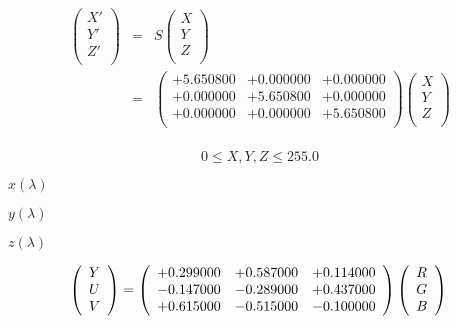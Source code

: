 \documentclass{article}
\begin{document}
\begin{eqnarray*} \left( \begin{array}{l} X' \\ Y' \\ Z' \\ \end{array} \right) &=& S \left( \begin{array}{l} X \\ Y \\ Z \\ \end{array} \right) \\ &=& \left( \begin{array}{lll} +5.650800 & +0.000000 & +0.000000 \\ +0.000000 & +5.650800 & +0.000000 \\ +0.000000 & +0.000000 & +5.650800 \\ \end{array} \right) \left( \begin{array}{l} X \\ Y \\ Z \\ \end{array} \right) \\ \end{eqnarray*}
\pagebreak

\[ 0 \le X, Y, Z \le 255.0 \]
\pagebreak

$x\left(\lambda \right)$
\pagebreak

$y\left(\lambda \right)$
\pagebreak

$z\left(\lambda \right)$
\pagebreak

\[ \left( \begin{array}{l} Y \\ U \\ V \\ \end{array} \right) = \left( \begin{array}{lll} +0.299000 & +0.587000 & +0.114000 \\ -0.147000 & -0.289000 & +0.437000 \\ +0.615000 & -0.515000 & -0.100000 \\ \end{array} \right) \left( \begin{array}{l} R \\ G \\ B \\ \end{array} \right) \\ \]
\pagebreak
\end{document}
